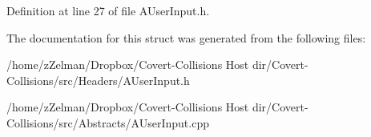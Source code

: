 Definition at line 27 of file A\-User\-Input.\-h.



The documentation for this struct was generated from the following files\-:\begin{DoxyCompactItemize}
\item 
/home/z\-Zelman/\-Dropbox/\-Covert-\/\-Collisions Host dir/\-Covert-\/\-Collisions/src/\-Headers/A\-User\-Input.\-h\item 
/home/z\-Zelman/\-Dropbox/\-Covert-\/\-Collisions Host dir/\-Covert-\/\-Collisions/src/\-Abstracts/A\-User\-Input.\-cpp\end{DoxyCompactItemize}
